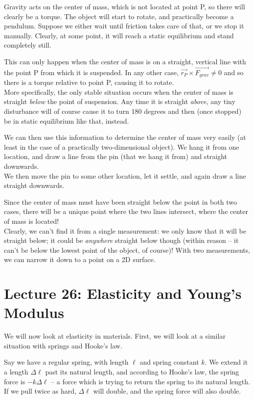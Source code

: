 Gravity acts on the center of mass, which is not located at point P, so there will clearly be a torque. The object will start to rotate, and practically become a pendulum. Suppose we either wait until friction takes care of that, or we stop it manually. Clearly, at some point, it will reach a static equilibrium and stand completely still.

This can only happen when the center of mass is on a straight, vertical line with the point P from which it is suspended. In any other case, $\vec{r_P} \times \vec{F_{grav}} \neq 0$ and so there is a torque relative to point P, causing it to rotate.\\
More specifically, the only stable situation occurs when the center of mass is straight \emph{below} the point of suspension. Any time it is straight \emph{above}, any tiny disturbance will of course cause it to turn 180 degrees and then (once stopped) be in static equilibrium like that, instead.

We can then use this information to determine the center of mass very easily (at least in the case of a practically two-dimensional object). We hang it from one location, and draw a line from the pin (that we hang it from) and straight downwards.\\
We then move the pin to some other location, let it settle, and again draw a line straight downwards.

Since the center of mass must have been straight below the point in both two cases, there will be a unique point where the two lines intersect, where the center of mass is located!\\
Clearly, we can't find it from a single measurement: we only know that it will be straight below; it could be \emph{anywhere} straight below though (within reason -- it can't be below the lowest point of the object, of course)! With two measurements, we can narrow it down to a point on a 2D surface.

\section{Lecture 26: Elasticity and Young's Modulus}

We will now look at elasticity in materials. First, we will look at a similar situation with springs and Hooke's law.

Say we have a regular spring, with length $\ell$ and spring constant $k$. We extend it a length $\Delta \ell$ past its natural length, and according to Hooke's law, the spring force is $-k \Delta \ell$ -- a force which is trying to return the spring to its natural length. If we pull twice as hard, $\Delta \ell$ will double, and the spring force will also double.

